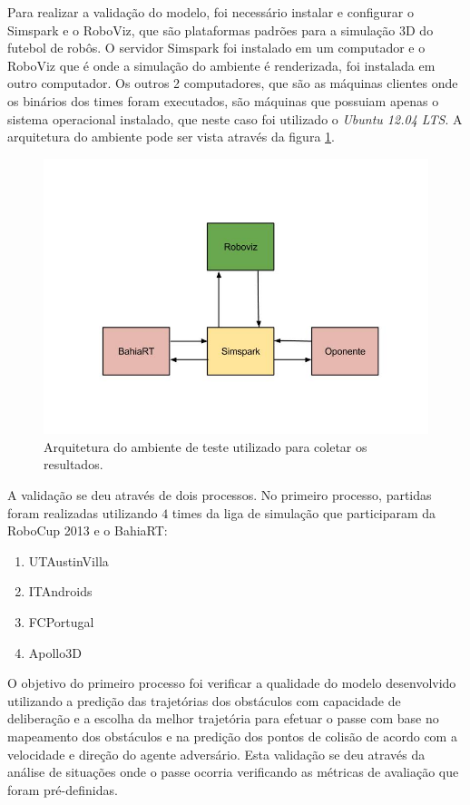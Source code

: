 Para realizar a validação do modelo, foi necessário instalar e configurar o Simspark e o RoboViz, que são plataformas padrões
para a simulação 3D do futebol de robôs. O servidor Simspark foi instalado em um computador e o RoboViz que é onde a simulação
do ambiente é renderizada, foi instalada em outro computador. Os outros 2 computadores, que são as máquinas clientes onde os 
binários dos times foram executados, são máquinas que possuiam apenas o sistema operacional instalado, que neste caso foi utilizado 
o {\it Ubuntu 12.04 LTS}. A arquitetura do ambiente pode ser vista através da figura \ref{fig:arquiteturaAmbiente}.

\begin{figure}[!htb]
\centering
\includegraphics[scale=0.50]{figuras/ambienteTeste.jpg}
\caption{Arquitetura do ambiente de teste utilizado para coletar os resultados.} 
\label{fig:arquiteturaAmbiente}
\end{figure}
\FloatBarrier

A validação se deu através de dois processos. No primeiro processo, partidas foram realizadas utilizando $4$ times da liga de 
simulação que participaram da RoboCup 2013 e o BahiaRT:

\begin{enumerate}
 \item UTAustinVilla
 \item ITAndroids
 \item FCPortugal
 \item Apollo3D
\end{enumerate}

O objetivo do primeiro processo foi verificar a qualidade do modelo desenvolvido utilizando a predição das trajetórias dos 
obstáculos com capacidade de deliberação e a escolha da melhor trajetória para efetuar o passe com base no mapeamento dos 
obstáculos e na predição dos pontos de colisão de acordo com a velocidade e direção do agente adversário. Esta validação se 
deu através da análise de situações onde o passe ocorria verificando as métricas de avaliação que foram pré-definidas.

